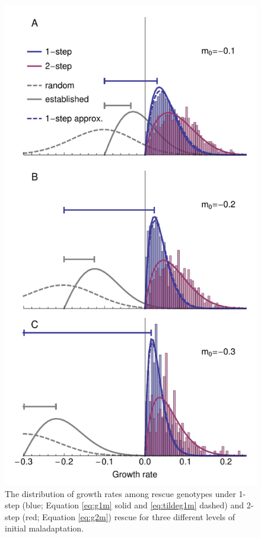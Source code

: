 \documentclass[9pt,twocolumn,twoside,lineno]{gsajnl}
\begin{document}
\begin{figure}[htbp]
\centering
\includegraphics[width=\linewidth]{Figure6.pdf}
\caption{
The distribution of growth rates among rescue genotypes under 1-step (blue; Equation \ref{eq:g1m} solid and \ref{eq:tildeg1m} dashed) and 2-step (red; Equation \ref{eq:g2m}) rescue for three different levels of initial maladaptation.
}
\end{figure}
\end{document}

